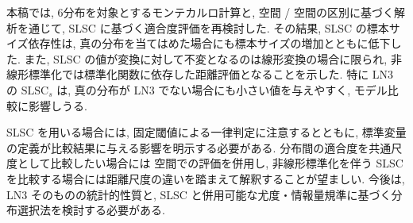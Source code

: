 本稿では, 6分布を対象とするモンテカルロ計算と, \Xsp 空間 / \Ssp 空間の区別に基づく解析を通じて, SLSC に基づく適合度評価を再検討した.
その結果,  SLSC の標本サイズ依存性は, 真の分布を当てはめた場合にも標本サイズの増加とともに低下した.
また,  SLSC の値が変換に対して不変となるのは線形変換の場合に限られ, 非線形標準化では標準化関数に依存した距離評価となることを示した.
特に LN3 の \(\mathrm{SLSC}_s\) は, 真の分布が LN3 でない場合にも小さい値を与えやすく, モデル比較に影響しうる.

 SLSC を用いる場合には, 固定閾値による一律判定に注意するとともに, 標準変量の定義が比較結果に与える影響を明示する必要がある.
分布間の適合度を共通尺度として比較したい場合には \Xsp 空間での評価を併用し, 非線形標準化を伴う SLSC を比較する場合には距離尺度の違いを踏まえて解釈することが望ましい.
今後は, LN3 そのものの統計的性質と, SLSC と併用可能な尤度・情報量規準に基づく分布選択法を検討する必要がある.